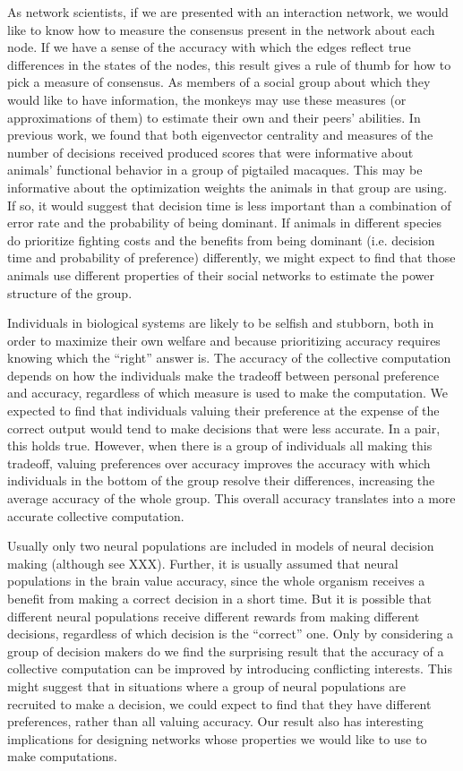 \documentclass{article}
\begin{document}
As network scientists, if we are presented with an interaction network, we would like to know how to measure the consensus present in the network about each node.  If we have a sense of the accuracy with which the edges reflect true differences in the states of the nodes, this result gives a rule of thumb for how to pick a measure of consensus. As members of a social group about which they would like to have information, the monkeys may use these measures (or approximations of them) to estimate their own and their peers' abilities. In previous work, we found that both eigenvector centrality and measures of the number of decisions received produced scores that were informative about animals' functional behavior in a group of pigtailed macaques.  This may be informative about the optimization weights the animals in that group are using.  If so, it would suggest that decision time is less important than a combination of error rate and the probability of being dominant. If animals in different species do prioritize fighting costs and the benefits from being dominant (i.e. decision time and probability of preference)  differently, we might expect to find that those animals use different properties of their social networks to estimate the power structure of the group.  

Individuals in biological systems are likely to be selfish and stubborn, both in order to maximize their own welfare and because prioritizing accuracy requires knowing which the ``right'' answer is.  The accuracy of the collective computation depends on how the individuals make the tradeoff between personal preference and accuracy, regardless of which measure is used to make the computation.  We expected to find that individuals valuing their preference at the expense of the correct output would tend to make decisions that were less accurate.  In a pair, this holds true.  However, when there is a group of individuals all making this tradeoff, valuing preferences over accuracy improves the accuracy with which individuals in the bottom of the group resolve their differences, increasing the average accuracy of the whole group. This overall accuracy translates into a more accurate collective computation.   

Usually only two neural populations are included in models of neural decision making (although see XXX).  Further, it is usually assumed that neural populations in the brain value accuracy, since the whole organism receives a benefit from making a correct decision in a short time.  But it is possible that different neural populations receive different rewards from making different decisions, regardless of which decision is the ``correct'' one.  Only by considering a group of decision makers do we find the surprising result that the accuracy of a collective computation can be improved by introducing conflicting interests.  This might suggest that in situations where a group of neural populations are recruited to make a decision, we could expect to find that they have different preferences, rather than all valuing accuracy. Our result also has interesting implications for designing networks whose properties we would like to use to make computations.
\end{document}
